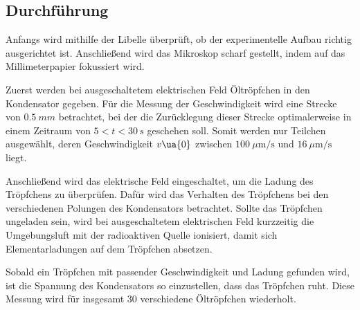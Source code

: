 \subsection{Durchführung}

Anfangs wird mithilfe der Libelle überprüft, ob der experimentelle Aufbau
richtig ausgerichtet ist. Anschließend wird das Mikroskop scharf gestellt, indem
auf das Millimeterpapier fokussiert wird.

Zuerst werden bei ausgeschaltetem elektrischen Feld Öltröpfchen in den Kondensator
gegeben. Für die Messung der Geschwindigkeit wird eine Strecke von $\SI{0,5}{mm}$
betrachtet, bei der die Zurücklegung dieser Strecke optimalerweise in einem Zeitraum
von $ 5 < t < 30 \, s$ geschehen soll. Somit werden nur Teilchen ausgewählt, deren
Geschwindigkeit $v\ua{0}$ zwischen $\SI{100}{\mu\meter\per\second}$ und
$\SI{16}{\mu\meter\per\second}$ liegt.

Anschließend wird das elektrische
Feld eingeschaltet, um die Ladung des Tröpfchens zu überprüfen. Dafür wird das
Verhalten des Tröpfchens bei den verschiedenen Polungen des Kondensators betrachtet.
Sollte das Tröpfchen
ungeladen sein, wird bei ausgeschaltetem elektrischen Feld kurzzeitig die Umgebungsluft
mit der radioaktiven Quelle ionisiert, damit sich Elementarladungen auf dem
Tröpfchen absetzen.

Sobald ein Tröpfchen mit passender Geschwindigkeit und Ladung gefunden wird, ist
die Spannung des Kondensators so einzustellen, dass das Tröpfchen ruht. Diese
Messung wird für insgesamt 30 verschiedene Öltröpfchen wiederholt.
